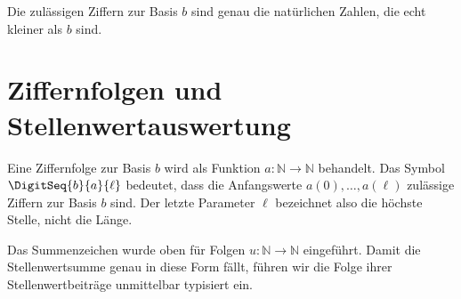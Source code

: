 \documentclass[main.tex]{subfiles}
\begin{document}
Die zulässigen Ziffern zur Basis \(b\) sind genau die natürlichen Zahlen, die
echt kleiner als \(b\) sind.


\section{Ziffernfolgen und Stellenwertauswertung}

Eine Ziffernfolge zur Basis \(b\) wird als Funktion
\(a\colon\mathbb{N}\to\mathbb{N}\) behandelt. Das Symbol
\(\DigitSeq{b}{a}{\ell}\) bedeutet, dass die Anfangswerte
\(a(0),\ldots,a(\ell)\) zulässige Ziffern zur Basis \(b\) sind. Der letzte
Parameter \(\ell\) bezeichnet also die höchste Stelle, nicht die Länge.


Das Summenzeichen wurde oben für Folgen \(u\colon\mathbb{N}\to\mathbb{N}\)
eingeführt. Damit die Stellenwertsumme genau in diese Form fällt, führen wir
die Folge ihrer Stellenwertbeiträge unmittelbar typisiert ein.

\begin{tabproof}
\end{tabproof}
\end{document}
